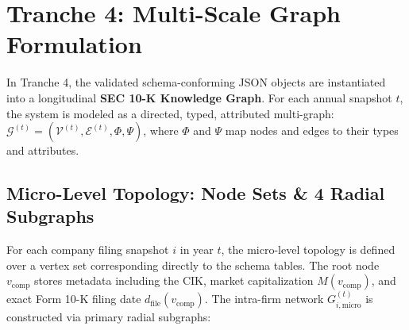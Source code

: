 \section{Tranche 4: Multi-Scale Graph Formulation}
\label{sec:network_model}

In Tranche 4, the validated schema-conforming JSON objects are instantiated into a longitudinal \textbf{SEC 10-K Knowledge Graph}. For each annual snapshot $t$, the system is modeled as a directed, typed, attributed multi-graph: $\mathcal{G}^{(t)} = ( \mathcal{V}^{(t)}, \mathcal{E}^{(t)}, \Phi, \Psi )$, where $\Phi$ and $\Psi$ map nodes and edges to their types and attributes.



\subsection{Micro-Level Topology: Node Sets \& 4 Radial Subgraphs}
For each company filing snapshot $i$ in year $t$, the micro-level topology is defined over a vertex set corresponding directly to the schema tables. The root node $v_{\text{comp}}$ stores metadata including the CIK, market capitalization $M(v_{\text{comp}})$, and exact Form 10-K filing date $d_{\text{file}}(v_{\text{comp}})$. The intra-firm network $G_{i,\text{micro}}^{(t)}$ is constructed via primary radial subgraphs:

